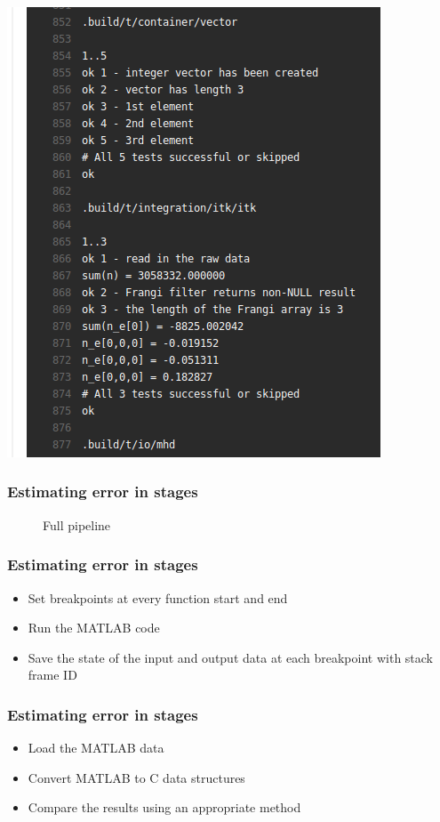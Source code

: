 \documentclass{beamer}
\begin{document}
\begin{frame}\frametitle{\subsecname} \centering\includegraphics[height=0.65\textwidth]{gfx/ci-3} \end{frame}

\begin{frame}\frametitle{Estimating error in stages}
\begin{figure}
	\resizebox{0.8\linewidth}{!}{}
	\caption{Full pipeline}
\end{figure}
\end{frame}

\begin{frame}\frametitle{Estimating error in stages}
	\begin{itemize}
	\item<1-> Set breakpoints at every function start and end
	\item<2-> Run the MATLAB code
	\item<3-> Save the state of the input and output data at
		each breakpoint with stack frame ID
	\end{itemize}
\end{frame}

\begin{frame}\frametitle{Estimating error in stages}
	\begin{itemize}
		\item<1-> Load the MATLAB data
		\item<2-> Convert MATLAB to C data structures
		\item<3-> Compare the results using an appropriate method
	\end{itemize}
\end{frame}
\end{document}
